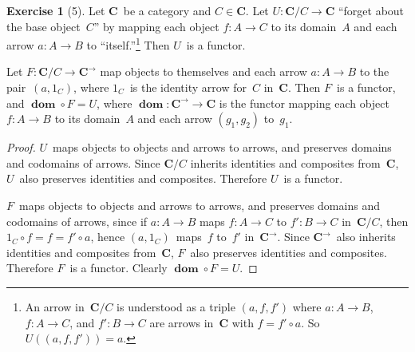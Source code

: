 \documentclass[letterpaper,12pt]{article}
\newcommand{\after}{\circ}
\DeclareMathOperator{\fdom}{\mathbf{dom}}
\newcommand{\cat}[1]{\mathbf{#1}}
\newcommand{\arr}[1]{#1^{\rightarrow}}
\newcommand{\C}{\cat{C}}
\theoremstyle{definition}
\newtheorem*{exer}{Exercise}
\theoremstyle{remark}
\theoremstyle{direction}
\begin{document}
\begin{exer}[5]
Let \(\C\)~be a category and \(C\in\C\). Let \(U:\C/C\to\C\) ``forget about the base object~\(C\)'' by mapping each object \(f:A\to C\) to its domain~\(A\) and each arrow \(a:A\to B\) to ``itself.''\footnote{An arrow in~\(\C/C\) is understood as a triple \((a,f,f')\) where \(a:A\to B\), \(f:A\to C\), and \(f':B\to C\) are arrows in~\(\C\) with \(f=f'\after a\). So \(U((a,f,f'))=a\).} Then \(U\)~is a functor.

Let \(F:\C/C\to\arr{\C}\) map objects to themselves and each arrow \(a:A\to B\) to the pair~\((a,1_C)\), where \(1_C\)~is the identity arrow for~\(C\) in~\(\C\). Then \(F\)~is a functor, and \(\fdom\after F=U\), where \(\fdom:\arr{\C}\to\C\) is the functor mapping each object \(f:A\to B\) to its domain~\(A\) and each arrow \((g_1,g_2)\) to~\(g_1\).
\end{exer}
\begin{proof}
\(U\)~maps objects to objects and arrows to arrows, and preserves domains and codomains of arrows. Since \(\C/C\) inherits identities and composites from~\(\C\), \(U\)~also preserves identities and composites. Therefore \(U\)~is a functor.

\(F\)~maps objects to objects and arrows to arrows, and preserves domains and codomains of arrows, since if \(a:A\to B\) maps \(f:A\to C\) to \(f':B\to C\) in~\(\C/C\), then \(1_C\after f=f=f'\after a\), hence \((a,1_C)\)~maps~\(f\) to~\(f'\) in~\(\arr{\C}\). Since \(\arr{\C}\)~also inherits identities and composites from~\(\C\), \(F\)~also preserves identities and composites. Therefore \(F\)~is a functor. Clearly \(\fdom\after F=U\).
\end{proof}
\end{document}
